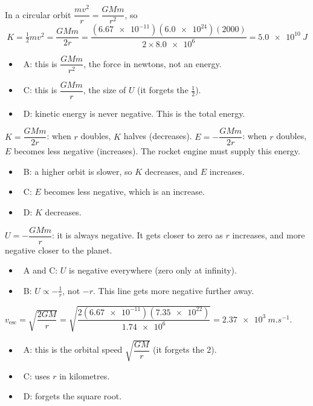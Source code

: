 \documentclass[12pt]{article}
\begin{document}
\begin{practiceanswers}
\begin{practiceans}
  In a circular orbit $\dfrac{mv^2}{r} = \dfrac{GMm}{r^2}$, so
  \[ K = \tfrac{1}{2}mv^2 = \frac{GMm}{2r} = \frac{(\num{6.67e-11})(\num{6.0e24})(2000)}{2 \times \num{8.0e6}}
     = \qty{5.0e10}{J} \]
  \begin{itemize}
    \item \xmark\ A: this is $\dfrac{GMm}{r^2}$, the force in newtons, not an energy.
    \item \xmark\ C: this is $\dfrac{GMm}{r}$, the size of $U$ (it forgets the $\frac{1}{2}$).
    \item \xmark\ D: kinetic energy is never negative. This is the total energy.
  \end{itemize}
\end{practiceans}

\begin{practiceans}
  $K = \dfrac{GMm}{2r}$: when $r$ doubles, $K$ halves (decreases). $E = -\dfrac{GMm}{2r}$: when $r$
  doubles, $E$ becomes less negative (increases). The rocket engine must supply this energy.
  \begin{itemize}
    \item \xmark\ B: a higher orbit is slower, so $K$ decreases, and $E$ increases.
    \item \xmark\ C: $E$ becomes less negative, which is an increase.
    \item \xmark\ D: $K$ decreases.
  \end{itemize}
\end{practiceans}

\begin{practiceans}
  $U = -\dfrac{GMm}{r}$: it is always negative. It gets closer to zero as $r$ increases, and more
  negative closer to the planet.
  \begin{itemize}
    \item \xmark\ A and C: $U$ is negative everywhere (zero only at infinity).
    \item \xmark\ B: $U \propto -\frac{1}{r}$, not $-r$. This line gets more negative further away.
  \end{itemize}
\end{practiceans}

\begin{practiceans}
  $v_\mathrm{esc} = \sqrt{\dfrac{2GM}{r}} = \sqrt{\dfrac{2(\num{6.67e-11})(\num{7.35e22})}{\num{1.74e6}}}
  = \qty{2.37e3}{m.s^{-1}}$.
  \begin{itemize}
    \item \xmark\ A: this is the orbital speed $\sqrt{\dfrac{GM}{r}}$ (it forgets the 2).
    \item \xmark\ C: uses $r$ in kilometres.
    \item \xmark\ D: forgets the square root.
  \end{itemize}
\end{practiceans}


\end{practiceanswers}
\end{document}
